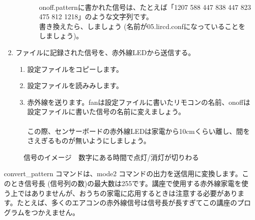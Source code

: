 \begin{enumerate}
\begin{enumerate}[1]
\begin{enumerate}[(1)]
\\onoff.patternに書かれた信号は、たとえば「1207 588 447 838 447 823 475 812 1218」のような文字列です。\\書き換えたら、しましょう (名前が05.lircd.confになっていることをしましょう)。
  \end{enumerate}
 \end{enumerate}
\item ファイルに記録された信号を、赤外線LEDから送信する。
 \begin{enumerate}[1]
  \item 設定ファイルをコピーします。 \\ 
  \item 設定ファイルを読みみします。\\ 
  \item 赤外線を送ります。fanは設定ファイルに書いたリモコンの名前、onoffは設定ファイルに書いた信号の名前に変えましょう。\\  \\ この際、センサーボードの赤外線LEDは家電から10cmくらい離し、間をさえぎるものが無いようにしましょう。
 \end{enumerate}
\end{enumerate}


\begin{figure}[H]
    \centering
 
    \caption{信号のイメージ　数字にある時間で点灯/消灯が切りわる}
\end{figure}

convert\_pattern コマンドは、mode2 コマンドの出力を送信用に変換します。このとき信号長 (信号列の数)の最大数は255です。講座で使用する赤外線家電を使う上ではありませんが、おうちの家電に応用するときは注意する必要があります。たとえば、多くのエアコンの赤外線信号は信号長が長すぎてこの講座のプログラムをつかえません。\\

\begin{tcolorbox}[title=\useOmetoi]
    \begin{enumerate}
    \end{enumerate}
    \end{tcolorbox}

